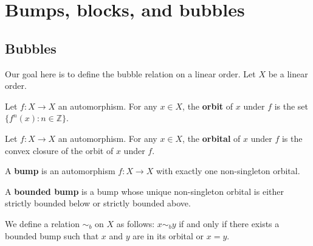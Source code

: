%
\chapter{Bumps, blocks, and bubbles}
\section*{Bubbles}
Our goal here is to define the bubble relation
on a linear order. Let $X$ be a linear order.

\begin{definition}
    \label{elem_orbit}
    \leanok
Let $f\colon X \to X$ an automorphism.
For any $x\in X$, the \textbf{orbit} of $x$ under $f$
is the set $\{f^n(x) : n \in \mathbb{Z}\}$.
\end{definition}

\begin{definition}
    \label{elem_orbital}
    \leanok
Let $f\colon X \to X$ an automorphism.
For any $x \in X$, the \textbf{orbital} of $x$ under $f$
is the convex closure of the orbit of $x$ under $f$.
\end{definition}

\begin{definition}
    \label{bump}
    \leanok
A \textbf{bump} is an automorphism
$f\colon X \to X$ with exactly one non-singleton orbital.
\end{definition}

\begin{definition}
    \label{boundedBump}
    \leanok
A \textbf{bounded bump} is a bump
whose unique non-singleton orbital
is either strictly bounded below
or strictly bounded above.
\end{definition}

\begin{definition}
    \label{bubbleR}
    \leanok
We define a relation $\sim_b$ on $X$ as follows:
$x \sim_b y$ if and only if there exists a
bounded bump such that $x$ and $y$ are in its
orbital or $x = y$.
\end{definition}